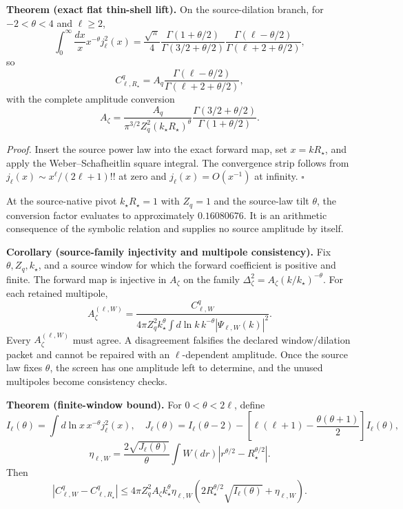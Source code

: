 \textbf{Theorem (exact flat thin-shell lift).}
\label{thm:oph330-exact-flat-thin-shell-lift}
On the source-dilation branch, for $-2<\theta<4$ and $\ell\ge2$,
\[
 \int_0^\infty\frac{dx}{x}x^{-\theta}j_\ell^2(x)
 =\frac{\sqrt\pi}{4}
  \frac{\Gamma(1+\theta/2)}{\Gamma(3/2+\theta/2)}
  \frac{\Gamma(\ell-\theta/2)}{\Gamma(\ell+2+\theta/2)},
\]
so
\[
 C_{\ell,R_\star}^q
 =A_q\frac{\Gamma(\ell-\theta/2)}
            {\Gamma(\ell+2+\theta/2)},
\]
with the complete amplitude conversion
\[
 \boxed{
 A_\zeta
 =\frac{A_q}{\pi^{3/2}Z_q^2(k_\star R_\star)^\theta}
  \frac{\Gamma(3/2+\theta/2)}{\Gamma(1+\theta/2)}.}
\]

\textit{Proof.}
Insert the source power law into the exact forward map, set $x=kR_\star$, and
apply the Weber--Schafheitlin square integral.  The convergence strip follows
from $j_\ell(x)\sim x^\ell/(2\ell+1)!!$ at zero and $j_\ell(x)=O(x^{-1})$ at
infinity.  \hfill$\square$

At the source-native pivot $k_\star R_\star=1$ with $Z_q=1$ and the
source-law tilt $\theta$, the conversion factor evaluates to approximately
$0.16080676$.  It is an arithmetic consequence of the symbolic relation and
supplies no source amplitude by itself.

\textbf{Corollary (source-family injectivity and multipole consistency).}
\label{cor:oph330-source-family-injectivity}
Fix \(\theta,Z_q,k_\star\), and a source window for which the forward
coefficient is positive and finite. The forward map is injective in
\(A_\zeta\) on the family
\(\Delta_\zeta^2=A_\zeta(k/k_\star)^{-\theta}\). For each retained multipole,
\[
A_\zeta^{(\ell,W)}
=\frac{C_{\ell,W}^q}
{4\pi Z_q^2k_\star^\theta
\int d\ln k\,k^{-\theta}|\Psi_{\ell,W}(k)|^2}.
\]
Every \(A_\zeta^{(\ell,W)}\) must agree. A disagreement falsifies the declared
window/dilation packet and cannot be repaired with an \(\ell\)-dependent
amplitude. Once the source law fixes \(\theta\), the screen has one amplitude
left to determine, and the unused multipoles become consistency checks.

\textbf{Theorem (finite-window bound).}
\label{thm:oph330-finite-window-bound}
For $0<\theta<2\ell$, define
\[
 I_\ell(\theta)=\int d\ln x\,x^{-\theta}j_\ell^2(x),
\quad
 J_\ell(\theta)=I_\ell(\theta-2)
 -\left[\ell(\ell+1)-\frac{\theta(\theta+1)}2\right]I_\ell(\theta),
\]
\[
 \eta_{\ell,W}
 =\frac{2\sqrt{J_\ell(\theta)}}{\theta}
  \int W(dr)|r^{\theta/2}-R_\star^{\theta/2}|.
\]
Then
\[
 |C_{\ell,W}^q-C_{\ell,R_\star}^q|
 \le4\pi Z_q^2A_\zeta k_\star^\theta\eta_{\ell,W}
 \left(2R_\star^{\theta/2}\sqrt{I_\ell(\theta)}+\eta_{\ell,W}\right).
\]

